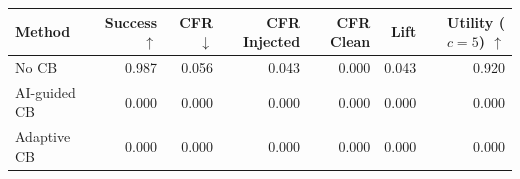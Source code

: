 \begin{tabular}{lrrrrrr}
\toprule
Method & Success $\uparrow$ & CFR $\downarrow$ & CFR Injected & CFR Clean & Lift & Utility ($c=5$) $\uparrow$ \\
\midrule
No CB & 0.987 & 0.056 & 0.043 & 0.000 & 0.043 & 0.920 \\
AI-guided CB & 0.000 & 0.000 & 0.000 & 0.000 & 0.000 & 0.000 \\
Adaptive CB & 0.000 & 0.000 & 0.000 & 0.000 & 0.000 & 0.000 \\
\bottomrule
\end{tabular}
